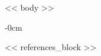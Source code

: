 \documentclass[journal,article,submit,moreauthors]{Definitions/mdpi}
\begin{document}
<< body >>

\begin{adjustwidth}{-\extralength}{0cm}



% 


<< references_block >>





%



\end{adjustwidth}
\end{document}

